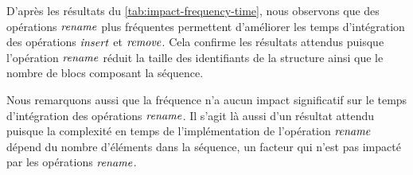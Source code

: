 D'après les résultats du \autoref{tab:impact-frequency-time}, nous observons que des opérations $\trm{rename}$ plus fréquentes permettent d'améliorer les temps d'intégration des opérations $\mathit{insert}$ et $\mathit{remove}$.
Cela confirme les résultats attendus puisque l'opération $\trm{rename}$ réduit la taille des identifiants de la structure ainsi que le nombre de blocs composant la séquence.

Nous remarquons aussi que la fréquence n'a aucun impact significatif sur le temps d'intégration des opérations $\trm{rename}$.
Il s'agit là aussi d'un résultat attendu puisque la complexité en temps de l'implémentation de l'opération $\trm{rename}$ dépend du nombre d'éléments dans la séquence, un facteur qui n'est pas impacté par les opérations $\trm{rename}$.

\begin{table}[!ht]
  \centering
  \caption{Taille des opérations par type et par fréquence d'opérations $\trm{rename}$}
  \label{tab:impact-frequency-memory}
\end{table}

